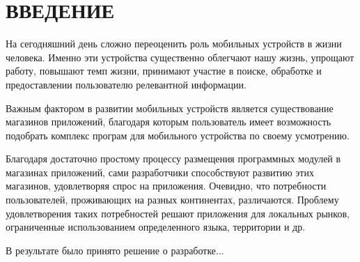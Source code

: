 \section*{ВВЕДЕНИЕ}

На сегодняшний день сложно переоценить роль мобильных устройств в жизни человека.
Именно эти устройства существенно облегчают нашу жизнь, упрощают работу,
повышают темп жизни, принимают участие в поиске, обработке и предоставлении
пользователю релевантной информации.

Важным фактором в развитии мобильных устройств является
существование магазинов приложений, благодаря которым пользователь имеет
возможность подобрать комплекс програм для мобильного устройства по своему усмотрению.

Благодаря достаточно простому процессу размещения программных модулей в магазинах
приложений, сами разработчики способствуют развитию этих магазинов, удовлетворяя
спрос на приложения. Очевидно, что потребности пользователей,
проживающих на разных континентах, различаются.
Проблему удовлетворения таких потребностей решают приложения для локальных рынков,
ограниченные использованием определенного языка, территории и др.

В результате было принято решение о разработке...





